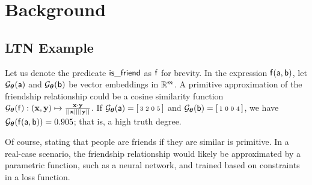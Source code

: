 \section{Background}

\subsection{LTN Example}
\label{appendix:example_sat_ltn}
Let us denote the predicate $\mathsf{is\_friend}$ as $\mathsf{f}$ for brevity.
In the expression $\mathsf{f}(\mathsf{a},\mathsf{b})$, let $\mathcal{G}_{\boldsymbol{\theta}}(\mathsf{a})$ and $\mathcal{G}_{\boldsymbol{\theta}}(\mathsf{b})$ be vector embeddings in $\mathbb{R}^m$.
A primitive approximation of the friendship relationship could be a cosine similarity function $\mathcal{G}_{\boldsymbol{\theta}}(\mathsf{f}) : (\mathbf{x},\mathbf{y})\mapsto \frac{\mathbf{x} \cdot \mathbf{y}}{||\mathbf{x}|| ||\mathbf{y}||} $.  
If $\mathcal{G}_{\boldsymbol{\theta}}(\mathsf{a}) = \begin{bsmallmatrix}3&2&0&5\end{bsmallmatrix}$ and $\mathcal{G}_{\boldsymbol{\theta}}(\mathsf{b}) = \begin{bsmallmatrix}1&0&0&4\end{bsmallmatrix}$, we have 
$\mathcal{G}_{\boldsymbol{\theta}}(\mathsf{f}(\mathsf{a},\mathsf{b})) = 0.905$; that is, a high truth degree. 

Of course, stating that people are friends if they are similar is primitive.
In a real-case scenario, the friendship relationship would likely be approximated by a parametric function, such as a neural network, 
and trained based on constraints in a loss function.

